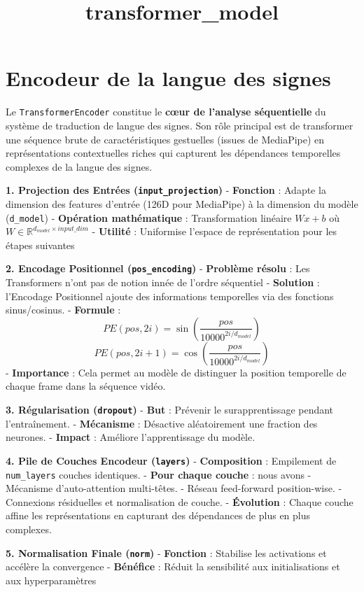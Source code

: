 \documentclass[12pt]{article}
\title{transformer\_model}
\begin{document}
    
    

    
    \section{Encodeur de la langue des
signes}\label{encodeur-de-la-langue-des-signes}

Le \texttt{TransformerEncoder} constitue le \textbf{cœur de l'analyse
séquentielle} du système de traduction de langue des signes. Son rôle
principal est de transformer une séquence brute de caractéristiques
gestuelles (issues de MediaPipe) en représentations contextuelles riches
qui capturent les dépendances temporelles complexes de la langue des
signes.

\textbf{1. Projection des Entrées (\texttt{input\_projection})} -
\textbf{Fonction} : Adapte la dimension des features d'entrée (126D pour
MediaPipe) à la dimension du modèle (\texttt{d\_model}) -
\textbf{Opération mathématique} : Transformation linéaire \(Wx + b\) où
\(W \in \mathbb{R}^{d_{model} \times input\_dim}\) - \textbf{Utilité} :
Uniformise l'espace de représentation pour les étapes suivantes

\textbf{2. Encodage Positionnel (\texttt{pos\_encoding})} -
\textbf{Problème résolu} : Les Transformers n'ont pas de notion innée de
l'ordre séquentiel - \textbf{Solution} : l'Encodage Positionnel ajoute
des informations temporelles via des fonctions sinus/cosinus. -
\textbf{Formule} :
\[PE(pos, 2i) = \sin\left(\frac{pos}{10000^{2i/d_{model}}}\right)\]
\[PE(pos, 2i+1) = \cos\left(\frac{pos}{10000^{2i/d_{model}}}\right)\] -
\textbf{Importance} : Cela permet au modèle de distinguer la position
temporelle de chaque frame dans la séquence vidéo.

\textbf{3. Régularisation (\texttt{dropout})} - \textbf{But} : Prévenir
le surapprentissage pendant l'entraînement. - \textbf{Mécanisme} :
Désactive aléatoirement une fraction des neurones. - \textbf{Impact} :
Améliore l'apprentissage du modèle.

\textbf{4. Pile de Couches Encodeur (\texttt{layers})} -
\textbf{Composition} : Empilement de \texttt{num\_layers} couches
identiques. - \textbf{Pour chaque couche} : nous avons - Mécanisme
d'auto-attention multi-têtes. - Réseau feed-forward position-wise. -
Connexions résiduelles et normalisation de couche. - \textbf{Évolution}
: Chaque couche affine les représentations en capturant des dépendances
de plus en plus complexes.

\textbf{5. Normalisation Finale (\texttt{norm})} - \textbf{Fonction} :
Stabilise les activations et accélère la convergence - \textbf{Bénéfice}
: Réduit la sensibilité aux initialisations et aux hyperparamètres
\end{document}
